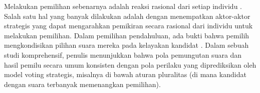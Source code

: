 Melakukan pemilihan sebenarnya adalah reaksi rasional dari setiap individu \cite{feddersen2004rational}. Salah satu hal yang banyak dilakukan adalah dengan menempatkan aktor-aktor strategis yang dapat mengarahkan pemikiran secara rasional dari individu untuk melakukan pemilihan. Dalam pemilihan pendahuluan, ada bukti bahwa pemilih mengkondisikan pilihan suara mereka pada kelayakan kandidat \cite{abramson1992sophisticated}. Dalam sebuah studi komprehensif, penulis \cite{cox1997making} menunjukkan bahwa pola pemungutan suara dan hasil pemilu secara umum konsisten dengan pola perilaku yang diprediksikan oleh model voting strategis, misalnya di bawah aturan pluralitas (di mana kandidat dengan suara terbanyak memenangkan pemilihan).
